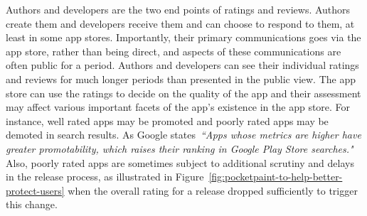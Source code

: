 Authors and developers are the two end points of ratings and reviews. Authors create them and developers receive them and can choose to respond to them, at least in some app stores. %
Importantly, their primary communications goes via the app store, rather than being direct, and aspects of these communications are often public for a period. Authors and developers can see their individual ratings and reviews for much longer periods than presented in the public view. The app store can use the ratings to decide on the quality of the app and their assessment may affect various important facets of the app's existence in the app store. For instance, well rated apps may be promoted and poorly rated apps may be demoted in search results. As Google states~\emph{``Apps whose metrics are higher have greater promotability, which raises their ranking in Google Play Store searches."}~ Also, poorly rated apps are sometimes subject to additional scrutiny and delays in the release process, as illustrated in Figure~\ref{fig:pocketpaint-to-help-better-protect-users} when the overall rating for a release dropped sufficiently to trigger this change. %

